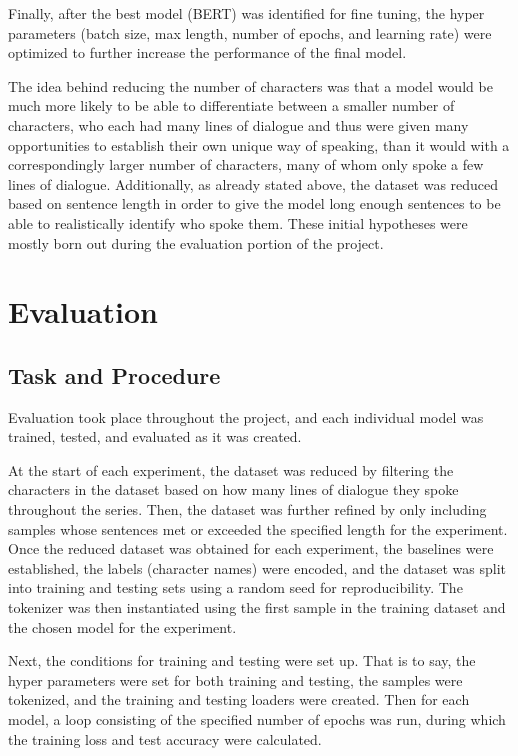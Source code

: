 \documentclass[11pt]{article}
\begin{document}
Finally, after the best model (BERT) \cite{devlin2018bert} was identified for fine tuning, the hyper parameters (batch size, max length, number of epochs, and learning rate) were optimized to further increase the performance of the final model.

The idea behind reducing the number of characters was that a model would be much more likely to be able to differentiate between a smaller number of characters, who each had many lines of dialogue and thus were given many opportunities to establish their own unique way of speaking, than it would with a correspondingly larger number of characters, many of whom only spoke a few lines of dialogue. Additionally, as already stated above, the dataset was reduced based on sentence length in order to give the model long enough sentences to be able to realistically identify who spoke them. These initial hypotheses were mostly born out during the evaluation portion of the project.

\section{Evaluation}

\subsection{Task and Procedure}

Evaluation took place throughout the project, and each individual model was trained, tested, and evaluated as it was created.

At the start of each experiment, the dataset was reduced by filtering the characters in the dataset based on how many lines of dialogue they spoke throughout the series. Then, the dataset was further refined by only including samples whose sentences met or exceeded the specified length for the experiment. Once the reduced dataset was obtained for each experiment, the baselines were established, the labels (character names) were encoded, and the dataset was split into training and testing sets using a random seed for reproducibility. The tokenizer was then instantiated using the first sample in the training dataset and the chosen model for the experiment.

Next, the conditions for training and testing were set up. That is to say, the hyper parameters were set for both training and testing, the samples were tokenized, and the training and testing loaders were created. Then for each model, a loop consisting of the specified number of epochs was run, during which the training loss and test accuracy were calculated.
\end{document}
